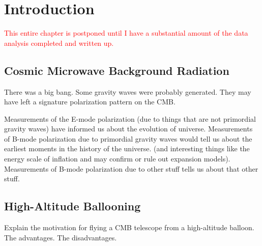 \chapter{Introduction}
\label{intro_chapter}

\textcolor{red}{This entire chapter is postponed until I have a substantial amount of the data analysis completed and written up. }


\section{Cosmic Microwave Background Radiation}
\label{sec:cmb_science}

There was a big bang. Some gravity waves were probably generated. They may have left a signature polarization pattern on the \ac{CMB}. 

Measurements of the E-mode polarization (due to things that are not primordial gravity waves) have informed us about the evolution of universe. 
Measurements of B-mode polarization due to primordial gravity waves would tell us about the earliest moments in the history of the universe. (and interesting things like the energy scale of inflation and may confirm or rule out expansion models).
Measurements of B-mode polarization due to other stuff tells us about that other stuff. 


\section{High-Altitude Ballooning}
\label{sec:balloons}

Explain the motivation for flying a CMB telescope from a high-altitude balloon. 
The advantages. 
The disadvantages. 

